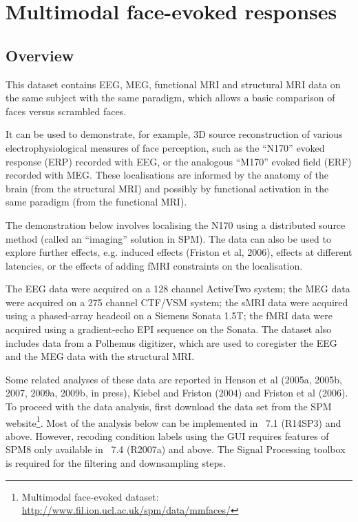 \chapter{Multimodal face-evoked responses \label{Chap:data:multimodal}}

\section{Overview}

This dataset contains EEG, MEG, functional MRI and structural MRI data on the same subject with the same paradigm, which allows a basic comparison of faces versus scrambled faces.

It can be used to demonstrate, for example, 3D source reconstruction of various electrophysiological measures of face perception, such as the ``N170'' evoked response (ERP) recorded with EEG, or the analogous ``M170'' evoked field (ERF) recorded with MEG. These localisations are informed by the anatomy of the brain (from the structural MRI) and possibly by functional activation in the same paradigm (from the functional MRI).

The demonstration below involves localising the N170 using a distributed source method (called an ``imaging'' solution in SPM). The data can also be used to explore further effects, e.g. induced effects (Friston et al, 2006), effects at different latencies, or the effects of adding fMRI constraints on the localisation.

The EEG data were acquired on a 128 channel ActiveTwo system; the MEG data were acquired on a 275 channel CTF/VSM system; the sMRI data were acquired using a phased-array headcoil on a Siemens Sonata 1.5T; the fMRI data were acquired using a gradient-echo EPI sequence on the Sonata. The dataset also includes data from a Polhemus digitizer, which are used to coregister the EEG and the MEG data with the structural MRI.

Some related analyses of these data are reported in Henson et al (2005a, 2005b, 2007, 2009a, 2009b, in press), Kiebel and Friston (2004) and Friston et al (2006). To proceed with the data analysis, first download the  data set from the SPM website\footnote{Multimodal face-evoked dataset: \url{http://www.fil.ion.ucl.ac.uk/spm/data/mmfaces/}}.
Most of the analysis below can be implemented in \matlab\ 7.1 (R14SP3) and above. However, recoding condition labels using the GUI requires features of SPM8 only available in \matlab\ 7.4 (R2007a) and above. The Signal Processing toolbox is required for the filtering and downsampling steps.

